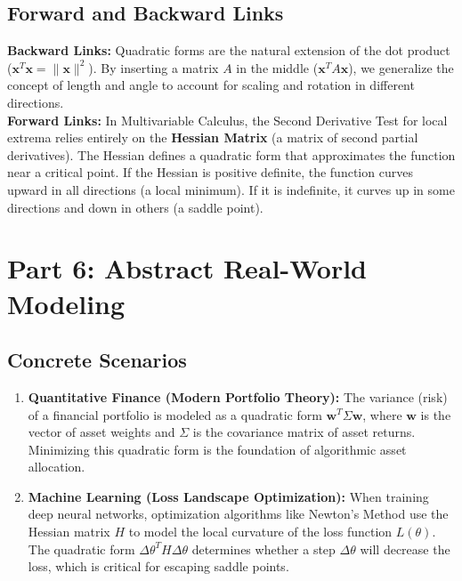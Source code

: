 \documentclass[11pt, letterpaper]{article}
\theoremstyle{definition}
\theoremstyle{remark}
\newcommand{\x}{\mathbf{x}}
\begin{document}
\subsection{Forward and Backward Links}
\textbf{Backward Links:} Quadratic forms are the natural extension of the dot product ($\x^T \x = \|\x\|^2$). By inserting a matrix $A$ in the middle ($\x^T A \x$), we generalize the concept of length and angle to account for scaling and rotation in different directions. \\
\textbf{Forward Links:} In Multivariable Calculus, the Second Derivative Test for local extrema relies entirely on the \textbf{Hessian Matrix} (a matrix of second partial derivatives). The Hessian defines a quadratic form that approximates the function near a critical point. If the Hessian is positive definite, the function curves upward in all directions (a local minimum). If it is indefinite, it curves up in some directions and down in others (a saddle point).

\newpage

\section{Part 6: Abstract Real-World Modeling}

\subsection{Concrete Scenarios}
\begin{enumerate}
    \item \textbf{Quantitative Finance (Modern Portfolio Theory):} The variance (risk) of a financial portfolio is modeled as a quadratic form $\mathbf{w}^T \Sigma \mathbf{w}$, where $\mathbf{w}$ is the vector of asset weights and $\Sigma$ is the covariance matrix of asset returns. Minimizing this quadratic form is the foundation of algorithmic asset allocation.
    \item \textbf{Machine Learning (Loss Landscape Optimization):} When training deep neural networks, optimization algorithms like Newton's Method use the Hessian matrix $H$ to model the local curvature of the loss function $L(\theta)$. The quadratic form $\Delta \theta^T H \Delta \theta$ determines whether a step $\Delta \theta$ will decrease the loss, which is critical for escaping saddle points.
\end{enumerate}
\end{document}

